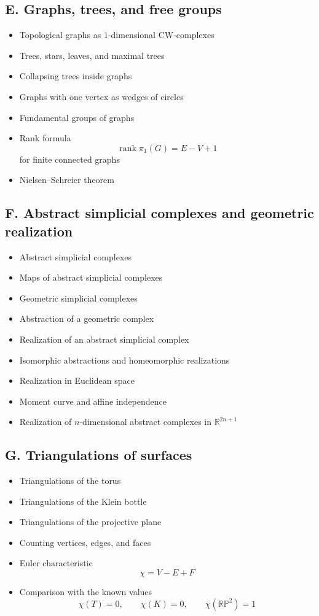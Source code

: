 \documentclass[12pt,a4paper]{article}
\theoremstyle{notespace}
\begin{document}
	\subsection*{E. Graphs, trees, and free groups}
	\begin{itemize}
		\item Topological graphs as \(1\)-dimensional CW-complexes
		\item Trees, stars, leaves, and maximal trees
		\item Collapsing trees inside graphs
		\item Graphs with one vertex as wedges of circles
		\item Fundamental groups of graphs
		\item Rank formula
		\[
		\operatorname{rank}\pi_1(G)=E-V+1
		\]
		for finite connected graphs
		\item Nielsen--Schreier theorem
	\end{itemize}
	
	\subsection*{F. Abstract simplicial complexes and geometric realization}
	\begin{itemize}
		\item Abstract simplicial complexes
		\item Maps of abstract simplicial complexes
		\item Geometric simplicial complexes
		\item Abstraction of a geometric complex
		\item Realization of an abstract simplicial complex
		\item Isomorphic abstractions and homeomorphic realizations
		\item Realization in Euclidean space
		\item Moment curve and affine independence
		\item Realization of \(n\)-dimensional abstract complexes in \(\mathbb R^{2n+1}\)
	\end{itemize}
	
	\subsection*{G. Triangulations of surfaces}
	\begin{itemize}
		\item Triangulations of the torus
		\item Triangulations of the Klein bottle
		\item Triangulations of the projective plane
		\item Counting vertices, edges, and faces
		\item Euler characteristic
		\[
		\chi=V-E+F
		\]
		\item Comparison with the known values
		\[
		\chi(T)=0,\qquad \chi(K)=0,\qquad \chi(\mathbb{RP}^2)=1
		\]
	\end{itemize}
	
\end{document}
